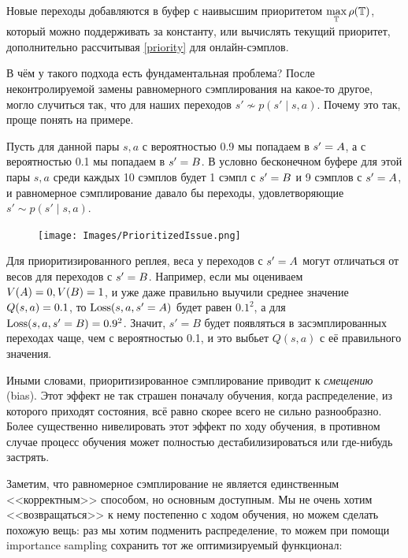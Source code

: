 \begin{remark}
Новые переходы добавляются в буфер с наивысшим приоритетом $\max\limits_{\mathbb{T} } \rho(\mathbb{T} )$, который можно поддерживать за константу, или вычислять текущий приоритет, дополнительно рассчитывая \eqref{priority} для онлайн-сэмплов.
\end{remark}

В чём у такого подхода есть фундаментальная проблема? После неконтролируемой замены равномерного сэмплирования на какое-то другое, могло случиться так, что для наших переходов $s' \not\sim p(s' \mid s, a)$. Почему это так, проще понять на примере.

\begin{example}
Пусть для данной пары $s, a$ с вероятностью 0.9 мы попадаем в $s' \HM= A$, а с вероятностью 0.1 мы попадаем в $s' \HM= B$. В условно бесконечном буфере для этой пары $s, a$ среди каждых 10 сэмплов будет 1 сэмпл с $s' \HM= B$ и 9 сэмплов с $s' \HM= A$, и равномерное сэмплирование давало бы переходы, удовлетворяющие $s' \sim p(s' \mid s, a)$. 

\begin{figure}
\vspace{-0.3cm}
\centering
\texttt{[image: Images/PrioritizedIssue.png]}
\end{figure}

Для приоритизированного реплея, веса у переходов с $s' \HM= A$ могут отличаться от весов для переходов с $s' \HM= B$. Например, если мы оцениваем $V(A) \HM= 0, V(B) \HM= 1$, и уже даже правильно выучили среднее значение $Q(s, a) \HM= 0.1$, то $\operatorname{Loss}(s, a, s'=A)$ будет равен $0.1^2$, а для $\operatorname{Loss}(s, a, s'=B) = 0.9^2$. Значит, $s' = B$ будет появляться в засэмплированных переходах чаще, чем с вероятностью 0.1, и это выбьет $Q(s, a)$ с её правильного значения.
\end{example}

Иными словами, приоритизированное сэмплирование приводит к \emph{смещению} (bias). Этот эффект не так страшен поначалу обучения, когда распределение, из которого приходят состояния, всё равно скорее всего не сильно разнообразно. Более существенно нивелировать этот эффект по ходу обучения, в противном случае процесс обучения может полностью дестабилизироваться или где-нибудь застрять.

Заметим, что равномерное сэмплирование не является единственным <<корректным>> способом, но основным доступным. Мы не очень хотим <<возвращаться>> к нему постепенно с ходом обучения, но можем сделать похожую вещь: раз мы хотим подменить распределение, то можем при помощи importance sampling сохранить тот же оптимизируемый функционал:

